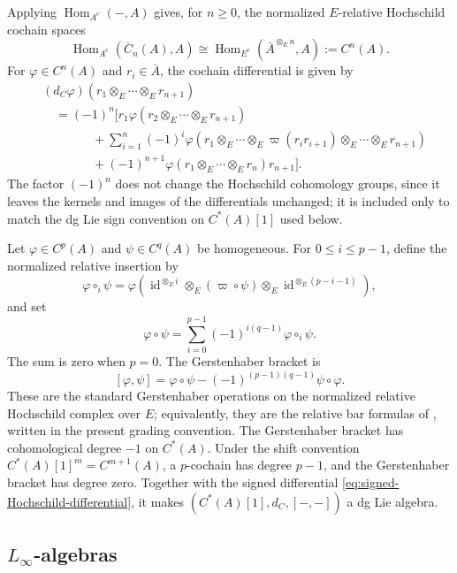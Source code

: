 \documentclass[11pt,a4paper,reqno]{amsart}
\newcommand{\Hom}{\operatorname{Hom}}
\newcommand{\id}{\operatorname{id}}
\theoremstyle{plain}
\theoremstyle{definition}
\numberwithin{equation}{section}
\begin{document}
	Applying $\Hom_{A^e}(-,A)$ gives, for $n\geq0$, the normalized
	$E$-relative Hochschild cochain spaces
	\[
	\Hom_{A^e}(\overline C_n(A),A)
	\cong
	\Hom_{E^e}(\bar A^{\otimes_E n},A):=C^n(A).
	\]
	For $\varphi\in C^n(A)$ and $r_i\in\bar A$, the cochain differential is
	given by  
	\begin{equation}\label{eq:signed-Hochschild-differential}
		\begin{aligned}
			&(d_C\varphi)(r_1\otimes_E\cdots\otimes_E r_{n+1})
			\\
			&\quad={}
			(-1)^n\Bigg[
			r_1\varphi(r_2\otimes_E\cdots\otimes_E r_{n+1})
			\\
			&\qquad\qquad+
			\sum_{i=1}^{n}(-1)^i
			\varphi(
			r_1\otimes_E\cdots\otimes_E\varpi(r_ir_{i+1})
			\otimes_E\cdots\otimes_E r_{n+1}
			)
			\\
			&\qquad\qquad+
			(-1)^{n+1}
			\varphi(r_1\otimes_E\cdots\otimes_E r_n)r_{n+1}
			\Bigg].
		\end{aligned}
	\end{equation}	 
	The factor $(-1)^n$ does not change the Hochschild cohomology groups,
	since it leaves the kernels and images of the differentials unchanged; it
	is included only to match the dg Lie sign convention on $C^*(A)[1]$ used
	below. 
	
	Let $\varphi\in C^p(A)$ and $\psi\in C^q(A)$ be homogeneous. For $0\leq i\leq p-1$, define the normalized relative insertion by
	\[
	\varphi\circ_i\psi
	=
	\varphi(
	\id^{\otimes_E i}\otimes_E(\varpi\circ\psi)
	\otimes_E\id^{\otimes_E(p-i-1)}
	),
	\]
	and set
	\[
	\varphi\circ\psi
	=
	\sum_{i=0}^{p-1}(-1)^{i(q-1)}\varphi\circ_i\psi.
	\]
	The sum is zero when $p=0$. The Gerstenhaber bracket is
	\[
	[\varphi,\psi]
	=
	\varphi\circ\psi-(-1)^{(p-1)(q-1)}\psi\circ\varphi.
	\]
	These are the standard Gerstenhaber operations on the normalized relative
	Hochschild complex over $E$; equivalently, they are the relative bar formulas
	of \cite[Section~2.2]{BSSWW26}, written in the present grading convention.
	The Gerstenhaber bracket has cohomological degree $-1$ on $C^*(A)$. Under
	the shift convention $C^*(A)[1]^m=C^{m+1}(A)$,
	a $p$-cochain has degree $p-1$, and the Gerstenhaber bracket has degree
	zero. Together with the signed differential
	\eqref{eq:signed-Hochschild-differential}, it makes $(C^*(A)[1],d_C,[-,-])$
	a dg Lie algebra.
	
	\subsection{\texorpdfstring{$L_\infty$-algebras}{L-infinity algebras}}
	\label{subsec:Linfty-preliminaries}
	
\end{document}
